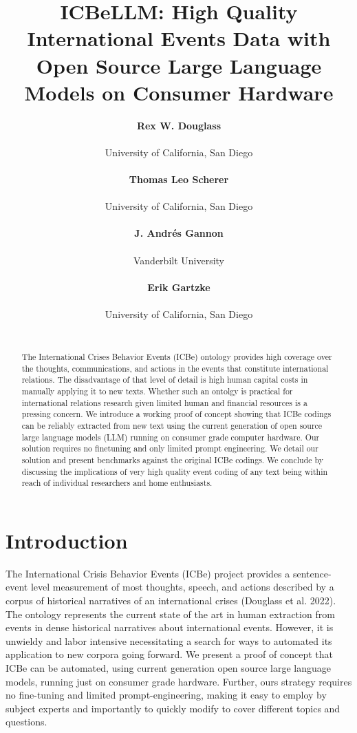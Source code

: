 \documentclass[
]{article}
\title{ICBeLLM: High Quality International Events Data with Open Source
Large Language Models on Consumer Hardware}
\author{\textbf{Rex W. Douglass}\\\\University of California, San
Diego\\\\\asep\textbf{Thomas Leo Scherer}\\\\University of California,
San Diego\\\\\asep\textbf{J. Andrés Gannon}\\\\Vanderbilt
University\\\\\asep\textbf{Erik Gartzke}\\\\University of California,
San Diego\\\\}
\date{}
\begin{document}
\maketitle
\begin{abstract}
The International Crises Behavior Events (ICBe) ontology provides high
coverage over the thoughts, communications, and actions in the events
that constitute international relations. The disadvantage of that level
of detail is high human capital costs in manually applying it to new
texts. Whether such an ontolgy is practical for international relations
research given limited human and financial resources is a pressing
concern. We introduce a working proof of concept showing that ICBe
codings can be reliably extracted from new text using the current
generation of open source large language models (LLM) running on
consumer grade computer hardware. Our solution requires no finetuning
and only limited prompt engineering. We detail our solution and present
benchmarks against the original ICBe codings. We conclude by discussing
the implications of very high quality event coding of any text being
within reach of individual researchers and home enthusiasts.
\end{abstract}

\section{Introduction}\label{introduction}

The International Crisis Behavior Events (ICBe) project provides a
sentence-event level measurement of most thoughts, speech, and actions
described by a corpus of historical narratives of an international
crises (Douglass et al. 2022). The ontology represents the current state
of the art in human extraction from events in dense historical
narratives about international events. However, it is unwieldy and labor
intensive necessitating a search for ways to automated its application
to new corpora going forward. We present a proof of concept that ICBe
can be automated, using current generation open source large language
models, running just on consumer grade hardware. Further, ours strategy
requires no fine-tuning and limited prompt-engineering, making it easy
to employ by subject experts and importantly to quickly modify to cover
different topics and questions.
\end{document}
